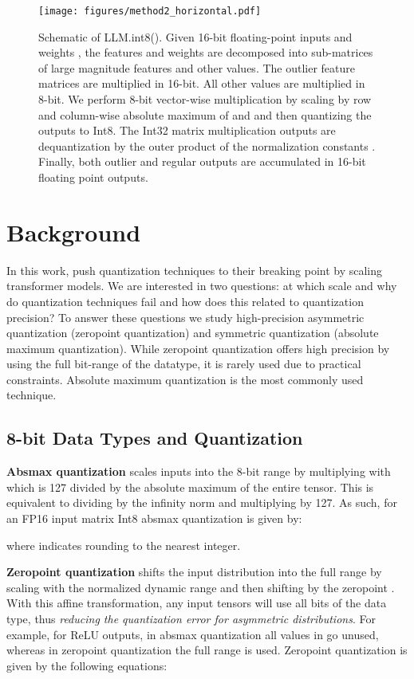 \documentclass{article}
\begin{document}
\begin{figure}[t]
     \centering
         \texttt{[image: figures/method2\_horizontal.pdf]}
        \caption{Schematic of LLM.int8(). Given 16-bit floating-point inputs  and weights , the features and weights are decomposed into sub-matrices of large magnitude features and other values. The outlier feature matrices are multiplied in 16-bit. All other values are multiplied in 8-bit. We perform 8-bit vector-wise multiplication by scaling by row and column-wise absolute maximum of  and  and then quantizing the outputs to Int8. The Int32 matrix multiplication outputs  are dequantization by the outer product of the normalization constants . Finally, both outlier and regular outputs are accumulated in 16-bit floating point outputs.}
        \label{fig:method}
\end{figure}


\section{Background}

In this work, push quantization techniques to their breaking point by scaling transformer models. We are interested in two questions: at which scale and why do quantization techniques fail and how does this related to quantization precision? To answer these questions we study high-precision asymmetric quantization (zeropoint quantization) and symmetric quantization (absolute maximum quantization). While zeropoint quantization offers high precision by using the full bit-range of the datatype, it is rarely used due to practical constraints. Absolute maximum quantization is the most commonly used technique.

\subsection{8-bit Data Types and Quantization}

\textbf{Absmax quantization} scales inputs into the 8-bit range  by multiplying with  which is 127 divided by the absolute maximum of the entire tensor. This is equivalent to dividing by the infinity norm and multiplying by 127. As such, for an FP16 input matrix  Int8 absmax quantization is given by:


where  indicates rounding to the nearest integer.

\textbf{Zeropoint quantization} shifts the input distribution into the full range  by scaling with the normalized dynamic range  and then shifting by the zeropoint . With this affine transformation, any input tensors will use all bits of the data type, thus {\it reducing the quantization error for asymmetric distributions}. For example, for ReLU outputs, in absmax quantization all values in  go unused, whereas in zeropoint quantization the full  range is used. Zeropoint quantization is given by the following equations:
\end{document}
